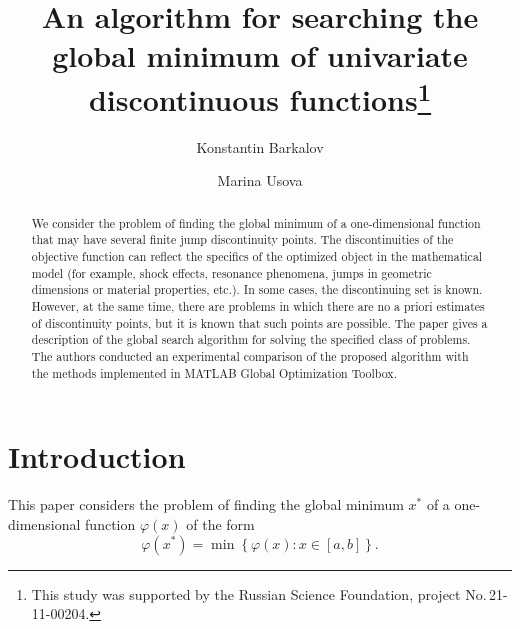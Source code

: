 \documentclass[runningheads]{llncs}
\begin{document}
%
\title{An algorithm for searching the global minimum of univariate discontinuous functions\thanks{This study was supported by the Russian Science Foundation, project No.\,21-11-00204.}}
%
%
\author{Konstantin Barkalov   
\and Marina Usova 
}
%
%
%
\maketitle              %
%
\begin{abstract}
We consider the problem of finding the global minimum of a one-dimensional function that may have several finite jump discontinuity points. The discontinuities of the objective function can reflect the specifics of the optimized object in the mathematical model (for example, shock effects, resonance phenomena, jumps in geometric dimensions or material properties, etc.). In some cases, the discontinuing set is known. However, at the same time, there are problems in which there are no a priori estimates of discontinuity points, but it is known that such points are possible. The paper gives a description of the global search algorithm for solving the specified class of problems. The authors conducted an experimental comparison of the proposed algorithm with the methods implemented in MATLAB Global Optimization Toolbox.


\end{abstract}
%
%
%
\section{Introduction}

This paper considers the problem of finding the global minimum $x^*$ of a one-dimensional function $\varphi(x)$ of the form 
\begin{equation}\label{problem}
\varphi(x^*)=\min\left\{\varphi(x):x\in\left[a,b\right]\right\}.
\end{equation}
\end{document}
